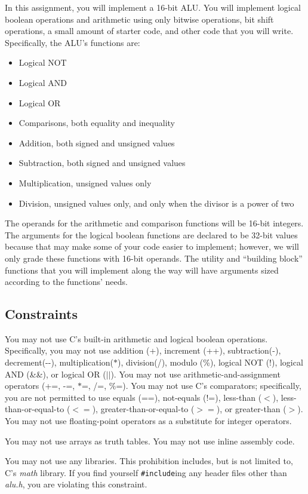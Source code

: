 In this assignment, you will implement a 16-bit ALU\@.
You will implement logical boolean operations and arithmetic using only bitwise operations, bit shift operations, a small amount of starter code, and other code that you will write.
Specifically, the ALU's functions are:
\begin{itemize}
    \item Logical NOT
    \item Logical AND
    \item Logical OR
    \item Comparisons, both equality and inequality
    \item Addition, both signed and unsigned values
    \item Subtraction, both signed and unsigned values
    \item Multiplication, unsigned values only
    \item Division, unsigned values only, and only when the divisor is a power of two
\end{itemize}
The operands for the arithmetic and comparison functions will be 16-bit integers.
The arguments for the logical boolean functions are declared to be 32-bit values because that may make some of your code easier to implement;
however, we will only grade these functions with 16-bit operands.
The utility and ``building block'' functions that you will implement along the way will have arguments sized according to the functions' needs.


\subsection{Constraints}

You may not use C's built-in arithmetic and logical boolean operations.
Specifically, you may not use addition (+), increment (++), subtraction(-), decrement(-{}-), multiplication($*$), division(/), modulo (\%), logical NOT (!), logical AND (\&\&), or logical OR ($||$).
You may not use arithmetic-and-assignment operators (+=, -=, $*$=, /=, \%=).
You may not use C's comparators;
specifically, you are not permitted to use equals (==), not-equals (!=), less-than ($<$), less-than-or-equal-to ($<=$), greater-than-or-equal-to ($>=$), or greater-than ($>$).
You may not use floating-point operators as a substitute for integer operators.

You may not use arrays as truth tables.
You may not use inline assembly code.

You may not use any libraries.
This prohibition includes, but is not limited to, C's \textit{math} library.
If you find yourself \lstinline{#include}ing any header files other than \textit{alu.h}, you are violating this constraint.


